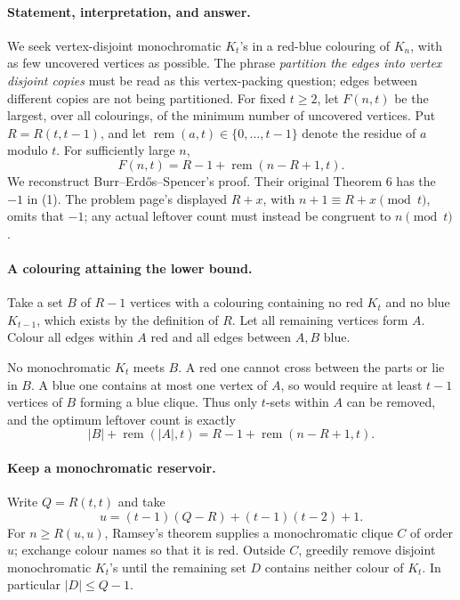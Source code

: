 \paragraph{Statement, interpretation, and answer.}
We seek vertex-disjoint monochromatic \(K_t\)'s in a red-blue colouring of \(K_n\), with as few uncovered vertices as possible. The phrase \emph{partition the edges into vertex disjoint copies} must be read as this vertex-packing question; edges between different copies are not being partitioned. For fixed \(t\geq2\), let \(F(n,t)\) be the largest, over all colourings, of the minimum number of uncovered vertices. Put \(R=R(t,t-1)\), and let \(\operatorname{rem}(a,t)\in\{0,\ldots,t-1\}\) denote the residue of \(a\) modulo \(t\). For sufficiently large \(n\),
\[
 \boxed{F(n,t)=R-1+\operatorname{rem}(n-R+1,t).}
\tag{1}
\]
We reconstruct Burr--Erd\H{o}s--Spencer's proof. Their original Theorem 6 has the \(-1\) in (1). The problem page's displayed \(R+x\), with \(n+1\equiv R+x\pmod t\), omits that \(-1\); any actual leftover count must instead be congruent to \(n\pmod t\).

\paragraph{A colouring attaining the lower bound.}
Take a set \(B\) of \(R-1\) vertices with a colouring containing no red \(K_t\) and no blue \(K_{t-1}\), which exists by the definition of \(R\). Let all remaining vertices form \(A\). Colour all edges within \(A\) red and all edges between \(A,B\) blue.

No monochromatic \(K_t\) meets \(B\). A red one cannot cross between the parts or lie in \(B\). A blue one contains at most one vertex of \(A\), so would require at least \(t-1\) vertices of \(B\) forming a blue clique. Thus only \(t\)-sets within \(A\) can be removed, and the optimum leftover count is exactly
\[
 |B|+\operatorname{rem}(|A|,t)=R-1+\operatorname{rem}(n-R+1,t).
\]

\paragraph{Keep a monochromatic reservoir.}
Write \(Q=R(t,t)\) and take
\[
 u=(t-1)(Q-R)+(t-1)(t-2)+1.
\]
For \(n\geq R(u,u)\), Ramsey's theorem supplies a monochromatic clique \(C\) of order \(u\); exchange colour names so that it is red. Outside \(C\), greedily remove disjoint monochromatic \(K_t\)'s until the remaining set \(D\) contains neither colour of \(K_t\). In particular \(|D|\leq Q-1\).

